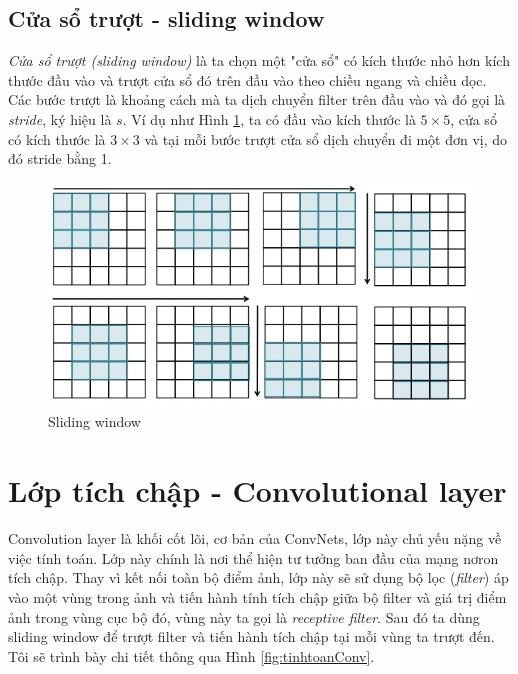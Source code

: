 \subsection{Cửa sổ trượt - sliding window}
\textit{Cửa sổ trượt (sliding window)} là ta chọn một "cửa sổ" có kích thước nhỏ hơn kích thước đầu vào và trượt cửa sổ đó trên đầu vào theo chiều ngang và chiều dọc. Các bước trượt là khoảng cách mà ta dịch chuyển filter trên đầu vào và đó gọi là \textit{stride}, ký hiệu là $s$. Ví dụ như Hình \ref{fig:slidingwindow}, ta có đầu vào kích thước là $5\times5$, cửa sổ có kích thước là $3\times3$ và tại mỗi bước trượt cửa sổ dịch chuyển đi một đơn vị, do đó stride bằng 1.
\begin{center}
\begin{figure}[htp]
	\begin{center}
		\includegraphics[scale=1]{chap4/image/slidingwindow.jpg}
	\end{center}
	\caption{Sliding window}
	\label{fig:slidingwindow}
\end{figure}
\end{center}

\section{Lớp tích chập - Convolutional layer}
Convolution layer là khối cốt lõi, cơ bản của ConvNets, lớp này chủ yếu nặng về việc tính toán. Lớp này chính là nơi thể hiện tư tưởng ban đầu của mạng nơron tích chập. Thay vì kết nối toàn bộ điểm ảnh, lớp này sẽ sử dụng bộ lọc (\textit{filter}) áp vào một vùng trong ảnh và tiến hành tính tích chập giữa bộ filter và giá trị điểm ảnh trong vùng cục bộ đó,  vùng này ta gọi là \textit{receptive filter}. Sau đó ta dùng sliding window để trượt filter và tiến hành tích chập tại mỗi vùng ta trượt đến. Tôi sẽ trình bày chi tiết thông qua Hình  \ref{fig:tinhtoanConv}.

